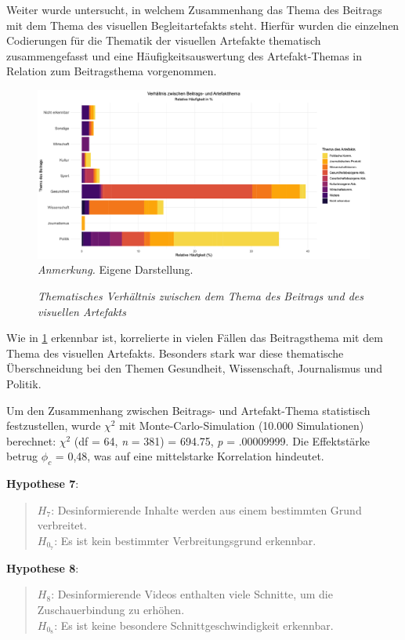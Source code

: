 \documentclass[12pt,a4paper]{article}        %
\begin{document}
Weiter wurde untersucht, in welchem Zusammenhang das Thema des Beitrags mit dem Thema des visuellen Begleitartefakts steht. Hierfür wurden die einzelnen Codierungen für die Thematik der visuellen Artefakte thematisch zusammengefasst und eine Häufigkeitsauswertung des Artefakt-Themas in Relation zum Beitragsthema vorgenommen. 
\begin{figure}
    \caption{\textit{Thematisches Verhältnis zwischen dem Thema des Beitrags und des visuellen Artefakts}}
    \label{fig:results_visual_coherence_plot}
    \centering
    \includegraphics[width=1\linewidth]{images/visual_coherence_plot.png}
\footnotesize\textit{Anmerkung.} Eigene Darstellung.
\end{figure}
Wie in \ref{fig:results_visual_coherence_plot} erkennbar ist, korrelierte in vielen Fällen das Beitragsthema mit dem Thema des visuellen Artefakts. Besonders stark war diese thematische Überschneidung bei den Themen Gesundheit, Wissenschaft, Journalismus und Politik.

Um den Zusammenhang zwischen Beitrags- und Artefakt-Thema statistisch festzustellen, wurde \(\chi^2\) mit Monte-Carlo-Simulation (10.000 Simulationen) berechnet: \(\chi^2\) (df = 64, \textit{n} = 381) = 694.75, \textit{p} = .00009999. Die Effektstärke betrug \(\phi_c\) = 0,48,  was auf eine mittelstarke Korrelation hindeutet. 

\textbf{Hypothese 7}:
\begin{quote}
  \(H_7\): Desinformierende Inhalte werden aus einem bestimmten Grund verbreitet.\\
  \(H_{0_7}\): Es ist kein bestimmter Verbreitungsgrund erkennbar.
\end{quote}

\textbf{Hypothese 8}:
\begin{quote}
  \(H_8\): Desinformierende Videos enthalten viele Schnitte, um die Zuschauerbindung zu erhöhen. \\
  \(H_{0_8}\): Es ist keine besondere Schnittgeschwindigkeit erkennbar.
\end{quote}
\end{document}
